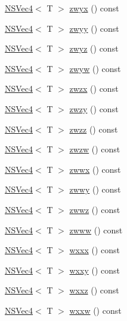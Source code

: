 \begin{DoxyCompactItemize}
\item 
\hyperlink{structNSVec4}{N\-S\-Vec4}$<$ T $>$ \hyperlink{structNSVec4_a18662a8f07ac43ebfd8afbee384c9f58}{zwyx} () const 
\item 
\hyperlink{structNSVec4}{N\-S\-Vec4}$<$ T $>$ \hyperlink{structNSVec4_afe5af56549c66b8724cc404ba63a4631}{zwyy} () const 
\item 
\hyperlink{structNSVec4}{N\-S\-Vec4}$<$ T $>$ \hyperlink{structNSVec4_adff4d8c44206d5a098e04edc2699f873}{zwyz} () const 
\item 
\hyperlink{structNSVec4}{N\-S\-Vec4}$<$ T $>$ \hyperlink{structNSVec4_a2a660ea7a6ce7aa8adb56ece140d0851}{zwyw} () const 
\item 
\hyperlink{structNSVec4}{N\-S\-Vec4}$<$ T $>$ \hyperlink{structNSVec4_a7ab23e1370d8ff01ef71f29f8708cd96}{zwzx} () const 
\item 
\hyperlink{structNSVec4}{N\-S\-Vec4}$<$ T $>$ \hyperlink{structNSVec4_a052f24ecf0eed7b5baa1d2b9182cfcec}{zwzy} () const 
\item 
\hyperlink{structNSVec4}{N\-S\-Vec4}$<$ T $>$ \hyperlink{structNSVec4_a06360864ebaed28854367388495d4cf0}{zwzz} () const 
\item 
\hyperlink{structNSVec4}{N\-S\-Vec4}$<$ T $>$ \hyperlink{structNSVec4_aa9e60f65c40b2798e4e2c6d031ce10f7}{zwzw} () const 
\item 
\hyperlink{structNSVec4}{N\-S\-Vec4}$<$ T $>$ \hyperlink{structNSVec4_a01852a26c99d7cc54f745fafaf72a0ac}{zwwx} () const 
\item 
\hyperlink{structNSVec4}{N\-S\-Vec4}$<$ T $>$ \hyperlink{structNSVec4_aa5fcf361f8f392ce0c0530f94ae019f1}{zwwy} () const 
\item 
\hyperlink{structNSVec4}{N\-S\-Vec4}$<$ T $>$ \hyperlink{structNSVec4_aef2b59869e420f2a8655bd0898f3e2c7}{zwwz} () const 
\item 
\hyperlink{structNSVec4}{N\-S\-Vec4}$<$ T $>$ \hyperlink{structNSVec4_a359056a6ff19ee10ec7c7d7ea05e5016}{zwww} () const 
\item 
\hyperlink{structNSVec4}{N\-S\-Vec4}$<$ T $>$ \hyperlink{structNSVec4_a1b649fb9cbbce6857df7e1546c642943}{wxxx} () const 
\item 
\hyperlink{structNSVec4}{N\-S\-Vec4}$<$ T $>$ \hyperlink{structNSVec4_a283ef9bb2705aac11e6f2df3a8ba6284}{wxxy} () const 
\item 
\hyperlink{structNSVec4}{N\-S\-Vec4}$<$ T $>$ \hyperlink{structNSVec4_a6f9f5f1fb890ed9acd1e0b0ee64b3027}{wxxz} () const 
\item 
\hyperlink{structNSVec4}{N\-S\-Vec4}$<$ T $>$ \hyperlink{structNSVec4_a7a5cf48e8b57c2d43754330501d01d45}{wxxw} () const 

\end{DoxyCompactItemize}
